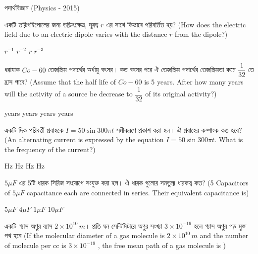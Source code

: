 \documentclass[addpoints]{exam}
\begin{document}
\begin{LARGE}
\begin{center}
পদার্থবিজ্ঞান (Physics - 2015)
\end{center}
\end{LARGE}
\begin{questions}

\question একটি তড়িৎদ্বিপোলের জন্য তড়িৎক্ষেত্র, দূরত্ব $ r $ এর সাথে কিভাবে পরিবর্তিত হয়? (How does the electric field due to an electric dipole varies with the distance $ r $ from the dipole?)

\begin{oneparchoices}
\choice $ r^{-1} $
\choice $ r^{-2} $
\choice $ r $
\choice $ r^{-3} $
\end{oneparchoices}

 \question  ধরাযাক $ Co-60 $ তেজস্ক্রিয় পদার্থের অর্ধায়ু বৎসর। কত বৎসর পরে ঐ তেজস্ক্রিয় পদার্থের তেজস্ক্রিয়তা কমে $ \dfrac{1}{32} $ তে হ্রাস পাবে? (Assume that the half life of $ Co-60 $ is 5 years. After how many years will the activity of a source be decrease to $ \dfrac{1}{32} $ of its original activity?)

\begin{oneparchoices}
 years
 years
 years
 years

\end{oneparchoices}

\question একটি দিক পরিবর্তী প্রবাহকে $ I = 50\sin 300 \pi t $ সমীকরণে প্রকাশ করা হল। ঐ প্রবাহের কম্পাংক কত হবে? (An alternating current is expressed by the equation $ I = 50\sin 300 \pi t $. What is the frequency of the current?)

\begin{oneparchoices}
 Hz
 Hz
 Hz
 Hz
\end{oneparchoices}

\question  $ 5\mu F $  এর 5টি ধারক সিরিজ সংযোগে সংযুক্ত করা হল। ঐ ধারক গুলোর সমতুল্য ধারকত্ব কত? (5 Capacitors of $ 5\mu F $ capacitance each are connected in series. Their equivalent capacitance is)

\begin{oneparchoices}
 \choice $ 5\mu F $ 
 \choice $ 4\mu F $ 
 \choice $ 1\mu F $ 
 \choice $ 10\mu F $ 
\end{oneparchoices}

\question একটি গ্যাস অণুর ব্যাস $ 2\times 10^{10}\,m $। প্রতি ঘন সেন্টিমিটারে অণুর সংখ্যা $ 3\times 10^{-19} $ হলে গ্যাস অণুর গড় মুক্ত পথ হবে (If the molecular diameter of a gas molecule is $ 2\times 10^{10}\,m $ and the number of molecule per cc is $ 3\times 10^{-19} $ , the free mean path of a gas molecule is )


\end{questions}
\end{document}
